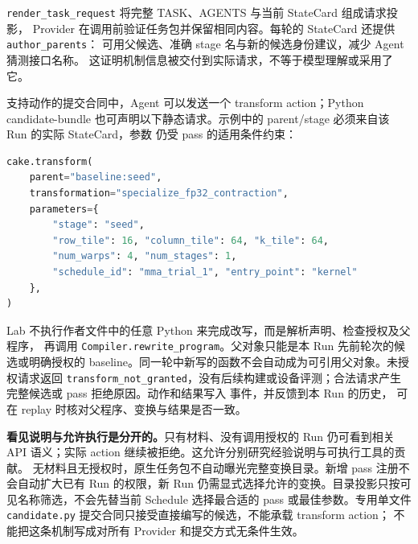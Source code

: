 \documentclass[UTF8,11pt,a4paper,fontset=none]{ctexart}
\newcommand{\code}[1]{\texttt{#1}}
\begin{document}
\code{render\_task\_request} 将完整 TASK、AGENTS 与当前 StateCard 组成请求投影，
Provider 在调用前验证任务包并保留相同内容。每轮的 StateCard 还提供 \code{author\_parents}：
可用父候选、准确 stage 名与新的候选身份建议，减少 Agent 猜测接口名称。
这证明机制信息被交付到实际请求，不等于模型理解或采用了它。

支持动作的提交合同中，Agent 可以发送一个 transform action；Python candidate-bundle
也可声明以下静态请求。示例中的 parent/stage 必须来自该 Run 的实际 StateCard，参数
仍受 pass 的适用条件约束：

\begin{lstlisting}[style=reportcode,language=Python]
cake.transform(
    parent="baseline:seed",
    transformation="specialize_fp32_contraction",
    parameters={
        "stage": "seed",
        "row_tile": 16, "column_tile": 64, "k_tile": 64,
        "num_warps": 4, "num_stages": 1,
        "schedule_id": "mma_trial_1", "entry_point": "kernel"
    },
)
\end{lstlisting}

Lab 不执行作者文件中的任意 Python 来完成改写，而是解析声明、检查授权及父程序，
再调用 \code{Compiler.rewrite\_program}。父对象只能是本 Run 先前轮次的候选或明确授权的
baseline。同一轮中新写的函数不会自动成为可引用父对象。未授权请求返回
\code{transform\_not\_granted}，没有后续构建或设备评测；合法请求产生完整候选或 pass
拒绝原因。动作和结果写入  事件，并反馈到本 Run 的历史，
可在 replay 时核对父程序、变换与结果是否一致\cite{bwagentactions}。

\textbf{看见说明与允许执行是分开的。}只有材料、没有调用授权的 Run 仍可看到相关 API
语义；实际 action 继续被拒绝。这允许分别研究经验说明与可执行工具的贡献。
无材料且无授权时，原生任务包不自动曝光完整变换目录。新增 pass 注册不会自动扩大已有
Run 的权限，新 Run 仍需显式选择允许的变换。目录投影只按可见名称筛选，不会先替当前
Schedule 选择最合适的 pass 或最佳参数。专用单文件
\code{candidate.py} 提交合同只接受直接编写的候选，不能承载 transform action；
不能把这条机制写成对所有 Provider 和提交方式无条件生效。
\end{document}
